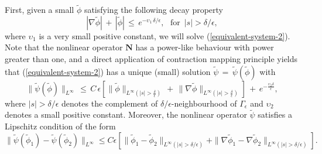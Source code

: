 \documentclass[10pt, reqno]{amsart}
\numberwithin{equation}{section}
\theoremstyle{definition}
\def\lf{\left}
\def\ri{\right}
\begin{document}
{{ First, given a small $ \tilde {\phi}$ satisfying the following decay property
\begin{equation}\label{decay-assumption}
|\nabla {\tilde\phi}|\,+\, |{\tilde\phi}|\,\leq\, e^{- { \upsilon_1\, \delta}/{\epsilon}}, \, \, \, \, \mbox{for}\, \, \, |s|>\delta/\epsilon,
\end{equation}
where $\upsilon_1$ is a very small positive constant, we will solve (\ref{equivalent-system-2}).
Note that the nonlinear operator $\mathbf{N}$ has a power-like behaviour with power greater than one, and a direct application of contraction mapping principle yields
that (\ref{equivalent-system-2}) has a unique (small) solution ${\tilde\psi} \,=\, {\tilde\psi}({\tilde\phi})$ with
\begin{equation}\label{contraction-varphi}
\|{\tilde\psi}({ \tilde \phi})\|_{L^{\infty}}\,\leq \, C\, \epsilon \lf[\|{\tilde\phi}\|_{L^{\infty}(|s|>\frac{\delta}{\epsilon})}\,+\, \|\nabla {\tilde\phi}\|_{L^{\infty}(|s|>\frac{\delta}{\epsilon})}\ri]\,+\,
e^{-\frac{ \upsilon_2 \delta}{\epsilon}},
\end{equation}
where $|s|>\delta/\epsilon$ denotes the complement of $\delta/\epsilon$-neighbourhood of
$\Gamma_\epsilon$ and $\upsilon_2$ denotes a small positive constant.
Moreover, the nonlinear operator $\tilde {\psi}$ satisfies a Lipschitz condition of the form
\begin{equation}\label{varphi-lip}
\|{\tilde\psi}({\tilde\phi}_1)-{\tilde\psi}({ \tilde \phi}_2)\|_{L^{\infty}}
\leq
C\epsilon \lf[ \|{\tilde\phi}_1-{\tilde\phi}_2\|_{L^{\infty}(|s|>\delta/\epsilon)}+\|\nabla {\tilde\phi}_1-\nabla {\tilde\phi}_2\|_{L^{\infty}(|s|>
\delta/\epsilon)}\ri].
\end{equation}


}}
\end{document}
